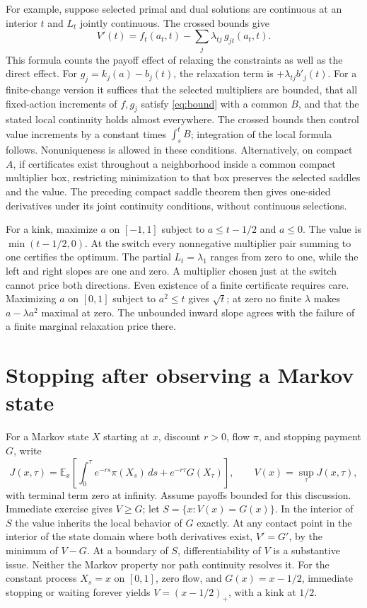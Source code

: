 \documentclass[11pt]{article}
\begin{document}
For example, suppose selected primal and dual solutions are continuous at an interior \(t\) and \(L_t\) jointly continuous. The crossed bounds give
\[
 V'(t)=f_t(a_t,t)-\sum_j\lambda_{tj}\,g_{jt}(a_t,t).
\]
This formula counts the payoff effect of relaxing the constraints as well as the direct effect. For \(g_j=k_j(a)-b_j(t)\), the relaxation term is \(+\lambda_{tj}b'_j(t)\). For a finite-change version it suffices that the selected multipliers are bounded, that all fixed-action increments of \(f,g_j\) satisfy \eqref{eq:bound} with a common \(B\), and that the stated local continuity holds almost everywhere. The crossed bounds then control value increments by a constant times \(\int_s^t B\); integration of the local formula follows. Nonuniqueness is allowed in these conditions. Alternatively, on compact \(A\), if certificates exist throughout a neighborhood inside a common compact multiplier box, restricting minimization to that box preserves the selected saddles and the value. The preceding compact saddle theorem then gives one-sided derivatives under its joint continuity conditions, without continuous selections.

For a kink, maximize \(a\) on \([-1,1]\) subject to \(a\leq t-1/2\) and \(a\leq0\). The value is \(\min(t-1/2,0)\). At the switch every nonnegative multiplier pair summing to one certifies the optimum. The partial \(L_t=\lambda_1\) ranges from zero to one, while the left and right slopes are one and zero. A multiplier chosen just at the switch cannot price both directions. Even existence of a finite certificate requires care. Maximizing \(a\) on \([0,1]\) subject to \(a^2\leq t\) gives \(\sqrt t\); at zero no finite \(\lambda\) makes \(a-\lambda a^2\) maximal at zero. The unbounded inward slope agrees with the failure of a finite marginal relaxation price there.

\section{Stopping after observing a Markov state}

For a Markov state \(X\) starting at \(x\), discount \(r>0\), flow \(\pi\), and stopping payment \(G\), write
\[
 J(x,\tau)=\mathbb E_x\!\left[\int_0^\tau e^{-rs}\pi(X_s)\,ds+
                                      e^{-r\tau}G(X_\tau)\right],
 \qquad V(x)=\sup_\tau J(x,\tau),
\]
with terminal term zero at infinity. Assume payoffs bounded for this discussion. Immediate exercise gives \(V\geq G\); let \(S=\{x:V(x)=G(x)\}\). In the interior of \(S\) the value inherits the local behavior of \(G\) exactly. At any contact point in the interior of the state domain where both derivatives exist, \(V'=G'\), by the minimum of \(V-G\). At a boundary of \(S\), differentiability of \(V\) is a substantive issue. Neither the Markov property nor path continuity resolves it. For the constant process \(X_s=x\) on \([0,1]\), zero flow, and \(G(x)=x-1/2\), immediate stopping or waiting forever yields \(V=(x-1/2)_+\), with a kink at \(1/2\).
\end{document}
